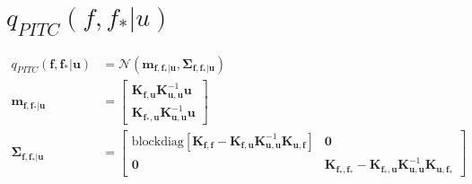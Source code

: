\documentclass[12pt, landscape]{article}
\begin{document}
\section{$q_{PITC}(f,f_{*}|u)$}
\begingroup\makeatletter{}\check@mathfonts
\def\maketag@@@#1{\hbox{\m@th\large\normalfont#1}}
\begin{align*}
q_{PITC}\left(\mathbf{f},\mathbf{f_{*}}|\mathbf{u}\right)&= \mathcal{N}\left(\mathbf{m}_{\mathbf{f},\mathbf{f_{*}}|\mathbf{u}},\mathbf{\Sigma}_{\mathbf{f},\mathbf{f_{*}}|\mathbf{u}}\right)\\
\mathbf{m}_{\mathbf{f},\mathbf{f_{*}}|\mathbf{u}} &= \left[\begin{smallmatrix}\mathbf{K}_{\mathbf{f},\mathbf{u}} \mathbf{K}_{\mathbf{u},\mathbf{u}}^{-1} \mathbf{u}\\\mathbf{K}_{\mathbf{f_{*}},\mathbf{u}} \mathbf{K}_{\mathbf{u},\mathbf{u}}^{-1} \mathbf{u}\end{smallmatrix}\right]\\
\mathbf{\Sigma}_{\mathbf{f},\mathbf{f_{*}}|\mathbf{u}} &= \left[\begin{smallmatrix}\text{blockdiag}[\mathbf{K}_{\mathbf{f},\mathbf{f}} - \mathbf{K}_{\mathbf{f},\mathbf{u}} \mathbf{K}_{\mathbf{u},\mathbf{u}}^{-1} \mathbf{K}_{\mathbf{u},\mathbf{f}}]&\mathbf{0}\\\mathbf{0}&\mathbf{K}_{\mathbf{f_{*}},\mathbf{f_{*}}} - \mathbf{K}_{\mathbf{f_{*}},\mathbf{u}} \mathbf{K}_{\mathbf{u},\mathbf{u}}^{-1} \mathbf{K}_{\mathbf{u},\mathbf{f_{*}}}\end{smallmatrix}\right]\\
\end{align*}\endgroup
\end{document}

